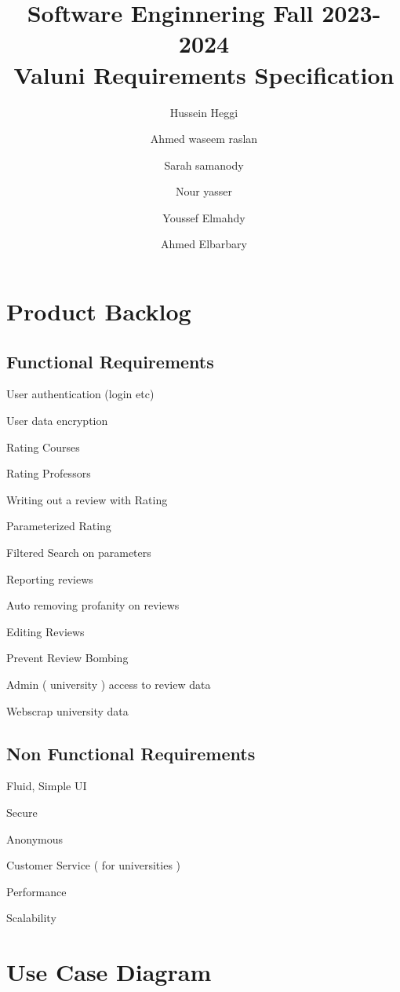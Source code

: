 \documentclass{article}
\title{Software Enginnering Fall 2023-2024 \\ Valuni Requirements Specification}
\author{  
Hussein Heggi 	\and
Ahmed waseem raslan 	\and
Sarah samanody 	\and
Nour yasser 	\and
Youssef Elmahdy	\and
Ahmed Elbarbary	}
\begin{document}
\maketitle 

\break

\section{Product Backlog}

\subsection{Functional Requirements}

	\quad User authentication (login etc)

	\quad User data encryption

	\quad Rating Courses

	\quad Rating Professors

	\quad Writing out a review with Rating

	\quad Parameterized Rating

	\quad Filtered Search on parameters

	\quad Reporting reviews

	\quad Auto removing profanity on reviews

	\quad Editing Reviews

	\quad Prevent Review Bombing

	\quad Admin ( university ) access to review data

	\quad Webscrap university data

\subsection{Non Functional Requirements} 

	\quad Fluid, Simple UI

	\quad Secure

	\quad Anonymous

	\quad Customer Service ( for universities )

	\quad Performance

	\quad Scalability

\section{Use Case Diagram} 
\end{document}
